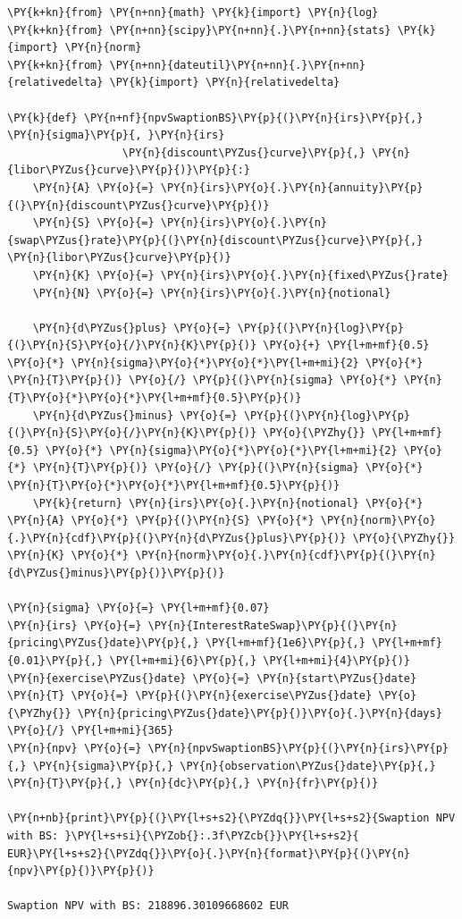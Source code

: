 \begin{tcolorbox}[breakable, size=fbox, boxrule=1pt, pad at break*=1mm,colback=cellbackground, colframe=cellborder]
\begin{Verbatim}[commandchars=\\\{\}]
\PY{k+kn}{from} \PY{n+nn}{math} \PY{k}{import} \PY{n}{log}
\PY{k+kn}{from} \PY{n+nn}{scipy}\PY{n+nn}{.}\PY{n+nn}{stats} \PY{k}{import} \PY{n}{norm} 
\PY{k+kn}{from} \PY{n+nn}{dateutil}\PY{n+nn}{.}\PY{n+nn}{relativedelta} \PY{k}{import} \PY{n}{relativedelta}

\PY{k}{def} \PY{n+nf}{npvSwaptionBS}\PY{p}{(}\PY{n}{irs}\PY{p}{,} \PY{n}{sigma}\PY{p}{, }\PY{n}{irs} 
                  \PY{n}{discount\PYZus{}curve}\PY{p}{,} \PY{n}{libor\PYZus{}curve}\PY{p}{)}\PY{p}{:}
    \PY{n}{A} \PY{o}{=} \PY{n}{irs}\PY{o}{.}\PY{n}{annuity}\PY{p}{(}\PY{n}{discount\PYZus{}curve}\PY{p}{)}
    \PY{n}{S} \PY{o}{=} \PY{n}{irs}\PY{o}{.}\PY{n}{swap\PYZus{}rate}\PY{p}{(}\PY{n}{discount\PYZus{}curve}\PY{p}{,} \PY{n}{libor\PYZus{}curve}\PY{p}{)}
    \PY{n}{K} \PY{o}{=} \PY{n}{irs}\PY{o}{.}\PY{n}{fixed\PYZus{}rate}
    \PY{n}{N} \PY{o}{=} \PY{n}{irs}\PY{o}{.}\PY{n}{notional}
    
    \PY{n}{d\PYZus{}plus} \PY{o}{=} \PY{p}{(}\PY{n}{log}\PY{p}{(}\PY{n}{S}\PY{o}{/}\PY{n}{K}\PY{p}{)} \PY{o}{+} \PY{l+m+mf}{0.5} \PY{o}{*} \PY{n}{sigma}\PY{o}{*}\PY{o}{*}\PY{l+m+mi}{2} \PY{o}{*} \PY{n}{T}\PY{p}{)} \PY{o}{/} \PY{p}{(}\PY{n}{sigma} \PY{o}{*} \PY{n}{T}\PY{o}{*}\PY{o}{*}\PY{l+m+mf}{0.5}\PY{p}{)}
    \PY{n}{d\PYZus{}minus} \PY{o}{=} \PY{p}{(}\PY{n}{log}\PY{p}{(}\PY{n}{S}\PY{o}{/}\PY{n}{K}\PY{p}{)} \PY{o}{\PYZhy{}} \PY{l+m+mf}{0.5} \PY{o}{*} \PY{n}{sigma}\PY{o}{*}\PY{o}{*}\PY{l+m+mi}{2} \PY{o}{*} \PY{n}{T}\PY{p}{)} \PY{o}{/} \PY{p}{(}\PY{n}{sigma} \PY{o}{*} \PY{n}{T}\PY{o}{*}\PY{o}{*}\PY{l+m+mf}{0.5}\PY{p}{)}
    \PY{k}{return} \PY{n}{irs}\PY{o}{.}\PY{n}{notional} \PY{o}{*} \PY{n}{A} \PY{o}{*} \PY{p}{(}\PY{n}{S} \PY{o}{*} \PY{n}{norm}\PY{o}{.}\PY{n}{cdf}\PY{p}{(}\PY{n}{d\PYZus{}plus}\PY{p}{)} \PY{o}{\PYZhy{}} \PY{n}{K} \PY{o}{*} \PY{n}{norm}\PY{o}{.}\PY{n}{cdf}\PY{p}{(}\PY{n}{d\PYZus{}minus}\PY{p}{)}\PY{p}{)}

\PY{n}{sigma} \PY{o}{=} \PY{l+m+mf}{0.07}
\PY{n}{irs} \PY{o}{=} \PY{n}{InterestRateSwap}\PY{p}{(}\PY{n}{pricing\PYZus{}date}\PY{p}{,} \PY{l+m+mf}{1e6}\PY{p}{,} \PY{l+m+mf}{0.01}\PY{p}{,} \PY{l+m+mi}{6}\PY{p}{,} \PY{l+m+mi}{4}\PY{p}{)}
\PY{n}{exercise\PYZus{}date} \PY{o}{=} \PY{n}{start\PYZus{}date} 
\PY{n}{T} \PY{o}{=} \PY{p}{(}\PY{n}{exercise\PYZus{}date} \PY{o}{\PYZhy{}} \PY{n}{pricing\PYZus{}date}\PY{p}{)}\PY{o}{.}\PY{n}{days} \PY{o}{/} \PY{l+m+mi}{365}
\PY{n}{npv} \PY{o}{=} \PY{n}{npvSwaptionBS}\PY{p}{(}\PY{n}{irs}\PY{p}{,} \PY{n}{sigma}\PY{p}{,} \PY{n}{observation\PYZus{}date}\PY{p}{,}  \PY{n}{T}\PY{p}{,} \PY{n}{dc}\PY{p}{,} \PY{n}{fr}\PY{p}{)}

\PY{n+nb}{print}\PY{p}{(}\PY{l+s+s2}{\PYZdq{}}\PY{l+s+s2}{Swaption NPV with BS: }\PY{l+s+si}{\PYZob{}:.3f\PYZcb{}}\PY{l+s+s2}{ EUR}\PY{l+s+s2}{\PYZdq{}}\PY{o}{.}\PY{n}{format}\PY{p}{(}\PY{n}{npv}\PY{p}{)}\PY{p}{)}

Swaption NPV with BS: 218896.30109668602 EUR
\end{Verbatim}
\end{tcolorbox}

